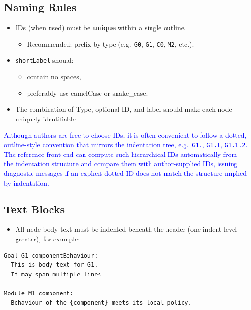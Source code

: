 \documentclass[11pt]{article}
\begin{document}
\subsection{Naming Rules}

\begin{itemize}[leftmargin=2em]
  \item IDs (when used) must be \textbf{unique} within a single outline.
  \begin{itemize}[leftmargin=1.5em]
    \item Recommended: prefix by type (e.g.\ \texttt{G0}, \texttt{G1}, \texttt{C0}, \texttt{M2}, etc.).
  \end{itemize}

  \item \texttt{shortLabel} should:
  \begin{itemize}[leftmargin=1.5em]
    \item contain no spaces,
    \item preferably use camelCase or snake\_case.
  \end{itemize}

  \item The combination of Type, optional ID, and label should make each node uniquely identifiable.
\end{itemize}

\textcolor{blue}{Although authors are free to choose IDs, it is often convenient to follow a dotted, outline-style convention that mirrors the indentation tree, e.g.\ \texttt{G1.}, \texttt{G1.1}, \texttt{G1.1.2}. The reference front-end can compute such hierarchical IDs automatically from the indentation structure and compare them with author-supplied IDs, issuing diagnostic messages if an explicit dotted ID does not match the structure implied by indentation.}

\subsection{Text Blocks}

\begin{itemize}[leftmargin=2em]
  \item All node body text must be indented beneath the header (one indent level greater), for example:
\end{itemize}

\begin{verbatim}
Goal G1 componentBehaviour:
  This is body text for G1.
  It may span multiple lines.

Module M1 component:
  Behaviour of the {component} meets its local policy.
\end{verbatim}
\end{document}
